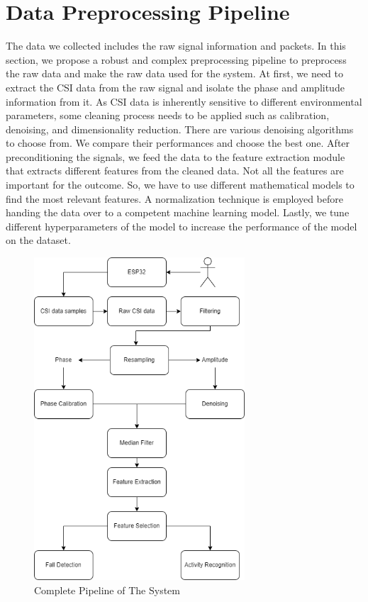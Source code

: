 \section{Data Preprocessing Pipeline}
The data we collected includes the raw signal information and packets. In this section, we propose a robust and complex preprocessing pipeline to preprocess the raw data and make the raw data used for the system. At first, we need to extract the CSI data from the raw signal and isolate the phase and amplitude information from it. As CSI data is inherently sensitive to different environmental parameters, some cleaning process needs to be applied such as calibration, denoising, and dimensionality reduction. There are various denoising algorithms to choose from. We compare their performances and choose the best one. After preconditioning the signals, we feed the data to the feature extraction module that extracts different features from the cleaned data. Not all the features are important for the outcome. So, we have to use different mathematical models to find the most relevant features. A normalization technique is employed before handing the data over to a competent machine learning model. Lastly, we tune different hyperparameters of the model to increase the performance of the model on the dataset. 

\begin{figure}[H]
\centering
\includegraphics[width=0.7\textwidth]{./figure/chap 4/csiProject.drawio.png}
\caption{Complete Pipeline of The System}
\label{Fig 4.11}
\end{figure}

